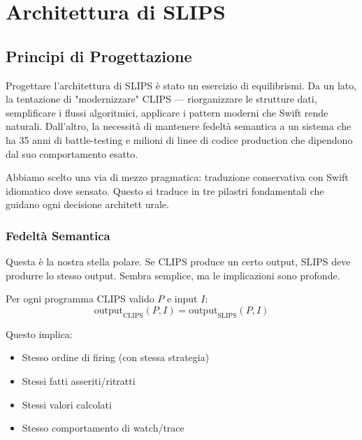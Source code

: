 
\chapter{Architettura di SLIPS}
\label{cap:slips_arch}

\section{Principi di Progettazione}

Progettare l'architettura di SLIPS è stato un esercizio di equilibrismi. Da un lato, la tentazione di "modernizzare" CLIPS — riorganizzare le strutture dati, semplificare i flussi algoritmici, applicare i pattern moderni che Swift rende naturali. Dall'altro, la necessità di mantenere fedeltà semantica a un sistema che ha 35 anni di battle-testing e milioni di linee di codice production che dipendono dal suo comportamento esatto.

Abbiamo scelto una via di mezzo pragmatica: traduzione conservativa con Swift idiomatico dove sensato. Questo si traduce in tre pilastri fondamentali che guidano ogni decisione architett urale.

\subsection{Fedeltà Semantica}

Questa è la nostra stella polare. Se CLIPS produce un certo output, SLIPS deve produrre lo stesso output. Sembra semplice, ma le implicazioni sono profonde.

\begin{definizione}
Per ogni programma CLIPS valido $P$ e input $I$:
\begin{equation}
\text{output}_{\text{CLIPS}}(P, I) = \text{output}_{\text{SLIPS}}(P, I)
\end{equation}
\end{definizione}

Questo implica:
\begin{itemize}
\item Stesso ordine di firing (con stessa strategia)
\item Stessi fatti asseriti/ritratti
\item Stessi valori calcolati
\item Stesso comportamento di watch/trace
\end{itemize}


